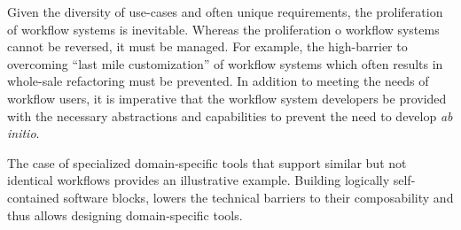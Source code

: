 Given the diversity of use-cases and often unique requirements, the
proliferation of workflow systems is inevitable. Whereas the proliferation o
workflow systems cannot be reversed, it must be managed. For example, the
high-barrier to overcoming “last mile customization” of workflow systems which
often results in whole-sale refactoring must be prevented. In addition to
meeting the needs of workflow users, it is imperative that the workflow system
developers be provided with the necessary abstractions and capabilities to
prevent the need to develop {\it ab initio}.

The case of specialized domain-specific tools that support similar but not
identical workflows provides an illustrative example. Building logically
self-contained software blocks, lowers the technical barriers to their
composability and thus allows designing domain-specific tools. 






